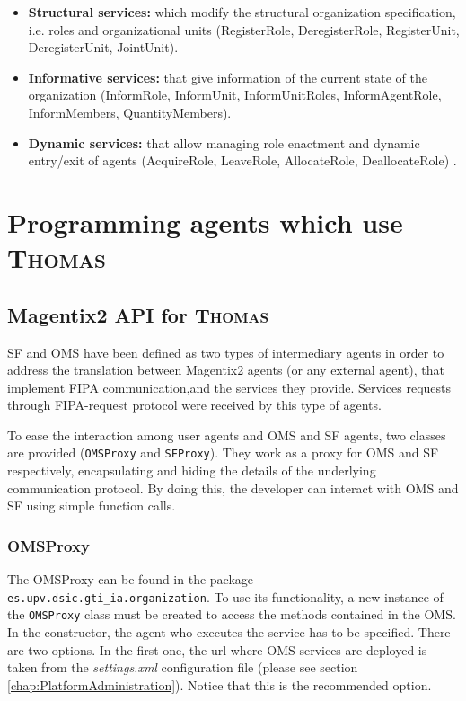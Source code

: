\begin{itemize}
	\item \textbf{Structural services:} which modify the structural organization specification, i.e. roles and organizational units (RegisterRole, DeregisterRole, RegisterUnit, DeregisterUnit, JointUnit).
	\item \textbf{Informative services:} that give information of the current state of the organization (InformRole, InformUnit, InformUnitRoles, InformAgentRole, InformMembers, QuantityMembers).
	\item \textbf{Dynamic services:} that allow managing role enactment and dynamic entry/exit of agents (AcquireRole, LeaveRole, AllocateRole, DeallocateRole) .
\end{itemize}




\section{Programming agents which use \textsc{Thomas}}

\subsection{Magentix2 API for \textsc{Thomas}}\label{thomasAPI}
SF and OMS have been defined as two types of intermediary agents in order to address the translation between Magentix2 agents (or any external agent), that implement FIPA communication,and the services they provide. Services requests through FIPA-request protocol were received by this type of agents.

To ease the interaction among user agents and OMS and SF agents, two classes are provided (\lstinline|OMSProxy| and \lstinline|SFProxy|). They work as a proxy for OMS and SF respectively, encapsulating and hiding the details of the underlying communication protocol. By doing this, the developer can interact with OMS and SF using simple function calls.

\subsubsection{OMSProxy}
The OMSProxy can be found in the package \lstinline|es.upv.dsic.gti_ia.organization|. To use its functionality, a new instance of the \lstinline|OMSProxy| class must be created to access the methods contained in the OMS. In the constructor, the agent who executes the service has to be specified. There are two options. In the first one, the url where OMS services are deployed is taken from the \textit{settings.xml} configuration file (please see section \ref{chap:PlatformAdministration}). Notice that this is the recommended option.

